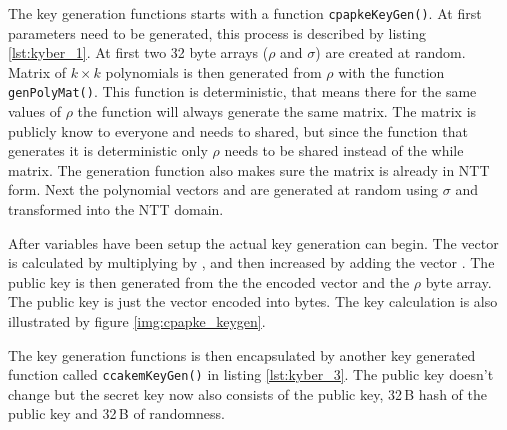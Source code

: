 The key generation functions starts with a function \texttt{cpapkeKeyGen()}. At first parameters need to be generated, this process is described by listing \ref{lst:kyber_1}. At first two 32 byte arrays ($\rho$ and $\sigma$) are created at random. Matrix  of $k\times k$ polynomials is then generated from $\rho$ with the function \texttt{genPolyMat()}. This function is deterministic, that means there for the same values of $\rho$ the function will always generate the same matrix. The matrix  is publicly know to everyone and needs to shared, but since the function that generates it is deterministic only $\rho$ needs to be shared instead of the while matrix. The generation function also makes sure the matrix is already in NTT form. Next the polynomial vectors  and  are generated at random using $\sigma$ and transformed into the NTT domain.

After variables have been setup the actual key generation can begin. The vector  is calculated by multiplying  by , and then increased by adding the vector . The public key is then generated from the the encoded vector  and the $\rho$ byte array. The public key is just the vector  encoded into bytes. The key calculation is also illustrated by figure \ref{img:cpapke_keygen}.
\newpage
{}

The key generation functions is then encapsulated by another key generated function called \texttt{ccakemKeyGen()} in listing \ref{lst:kyber_3}. The public key doesn't change but the secret key now also consists of the public key, 32\,B hash of the public key and 32\,B of randomness.

